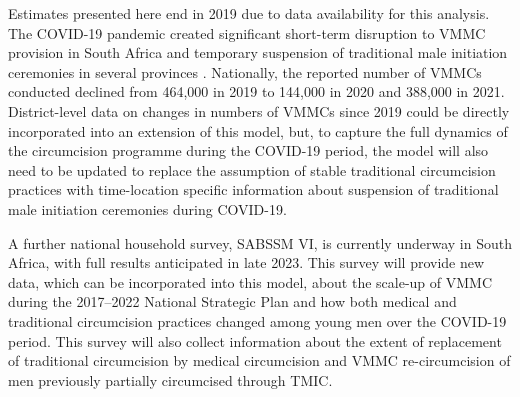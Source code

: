 \documentclass{article}
\begin{document}
Estimates presented here end in 2019 due to data availability for this analysis. The COVID-19 pandemic created significant short-term disruption to VMMC provision in South Africa \cite{peck2022effects} and temporary suspension of traditional male initiation ceremonies in several provinces \cite{ewn2020circumcisionschools}. Nationally, the reported number of VMMCs conducted declined from 464,000 in 2019 to 144,000 in 2020 and 388,000 in 2021. District-level data on changes in numbers of VMMCs since 2019 could be directly incorporated into an extension of this model, but, to capture the full dynamics of the circumcision programme during the COVID-19 period, the model will also need to be updated to replace the assumption of stable traditional circumcision practices with time-location specific information about suspension of traditional male initiation ceremonies during COVID-19.

A further national household survey, SABSSM VI, is currently underway in South Africa, with full results anticipated in late 2023. This survey will provide new data, which can be incorporated into this model, about the scale-up of VMMC during the 2017--2022 National Strategic Plan and how both medical and traditional circumcision practices changed among young men over the COVID-19 period. This survey will also collect information about the extent of replacement of traditional circumcision by medical circumcision and VMMC re-circumcision of men previously partially circumcised through TMIC.
\end{document}
